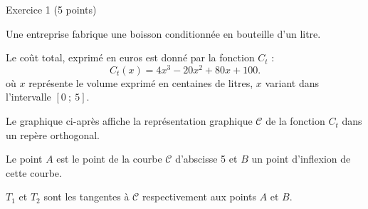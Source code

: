 
%
\begin{h2}Exercice 1 (5 points)\end{h2}
\par
Une entreprise fabrique une boisson conditionnée en bouteille d'un litre.
\par
Le coût total, exprimé en euros est donné par la fonction $C_t$ :
\[ C_t(x)=4x^3-20x^2+80x+100. \]
où $x$ représente le volume exprimé en centaines de litres, $x$ variant dans l'intervalle $[0~;~5]$.
\par
Le graphique ci-après affiche la représentation graphique $\mathscr{C}$ de la fonction $C_t$ dans un repère orthogonal.
\par
Le point $A$ est le point de la courbe $\mathscr{C}$ d'abscisse 5 et $B$ un point d'inflexion de cette courbe.
\par
$T_1$ et $T_2$ sont les tangentes à $\mathscr{C}$ respectivement aux points $A$ et $B$.


